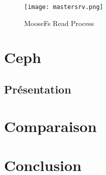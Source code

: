 \documentclass[12pt]{report}
\begin{document}
\begin{figure}[p]
	\texttt{[image: mastersrv.png]}
	\caption{MooseFs Read Process}
	\label{identifiant test}
\end{figure} 

	\chapter{Ceph}
		\section{Présentation}

	\chapter{Comparaison}

	\chapter{Conclusion}
\end{document}
